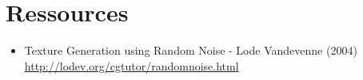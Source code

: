 \chapter{Ressources}
\label{s:ressources}

\begin{itemize}
\item Texture Generation using Random Noise - Lode Vandevenne (2004) \\ \url{http://lodev.org/cgtutor/randomnoise.html}\label{src-procedural-texture}
\end{itemize}